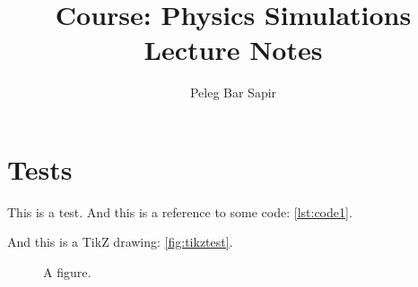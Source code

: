 \documentclass{article}
\title{Course: Physics Simulations\\Lecture Notes}
\author{Peleg Bar Sapir}
\begin{document}
\maketitle

\ifdefined\testcode
  \section{Tests}
  This is a test. And this is a reference to some code: \autoref{lst:code1}.
  

  And this is a TikZ drawing: \autoref{fig:tikztest}.

  \begin{figure}
      \begin{center}
      \end{center}
    \caption{A figure.}\label{fig:tikztest}
  \end{figure}
  
\else
\fi






\end{document}
